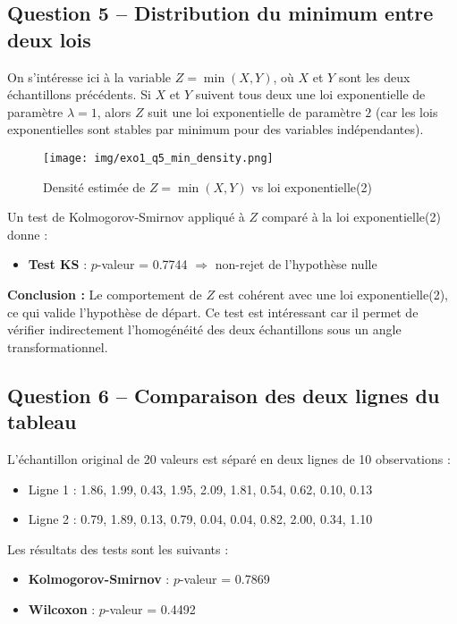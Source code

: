 \documentclass[a4paper,11pt]{article}
\begin{document}
\subsection*{Question 5 – Distribution du minimum entre deux lois}
On s’intéresse ici à la variable $Z = \min(X, Y)$, où $X$ et $Y$ sont les deux échantillons précédents. Si $X$ et $Y$ suivent tous deux une loi exponentielle de paramètre $\lambda = 1$, alors $Z$ suit une loi exponentielle de paramètre $2$ (car les lois exponentielles sont stables par minimum pour des variables indépendantes).

\begin{figure}[H]
    \centering
    \texttt{[image: img/exo1\_q5\_min\_density.png]}
    \caption{Densité estimée de $Z = \min(X,Y)$ vs loi exponentielle(2)}
\end{figure}

Un test de Kolmogorov-Smirnov appliqué à $Z$ comparé à la loi exponentielle(2) donne :
\begin{itemize}
    \item \textbf{Test KS} : $p$-valeur = 0.7744 \(\Rightarrow\) non-rejet de l’hypothèse nulle
\end{itemize}

\textbf{Conclusion :} Le comportement de $Z$ est cohérent avec une loi exponentielle(2), ce qui valide l’hypothèse de départ. Ce test est intéressant car il permet de vérifier indirectement l’homogénéité des deux échantillons sous un angle transformationnel.

\subsection*{Question 6 – Comparaison des deux lignes du tableau}
L’échantillon original de 20 valeurs est séparé en deux lignes de 10 observations :

\begin{itemize}
    \item Ligne 1 : 1.86, 1.99, 0.43, 1.95, 2.09, 1.81, 0.54, 0.62, 0.10, 0.13
    \item Ligne 2 : 0.79, 1.89, 0.13, 0.79, 0.04, 0.04, 0.82, 2.00, 0.34, 1.10
\end{itemize}

Les résultats des tests sont les suivants :
\begin{itemize}
    \item \textbf{Kolmogorov-Smirnov} : $p$-valeur = 0.7869
    \item \textbf{Wilcoxon} : $p$-valeur = 0.4492
\end{itemize}
\end{document}
